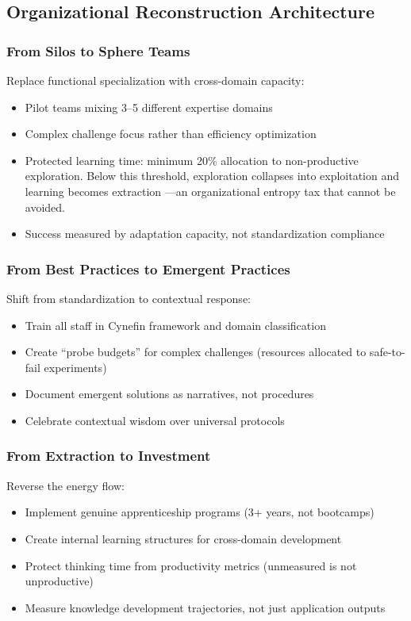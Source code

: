 \subsection{Organizational Reconstruction Architecture}
\label{sec:organizational-architecture}

\subsubsection{From Silos to Sphere Teams}

Replace functional specialization with cross-domain capacity:
\begin{itemize}
\item Pilot teams mixing 3--5 different expertise domains
\item Complex challenge focus rather than efficiency optimization
\item Protected learning time: minimum 20\% allocation to non-productive exploration. Below this threshold, exploration collapses into exploitation and learning becomes extraction \citep{march1991}---an organizational entropy tax that cannot be avoided.
\item Success measured by adaptation capacity, not standardization compliance
\end{itemize}

\subsubsection{From Best Practices to Emergent Practices}

Shift from standardization to contextual response:
\begin{itemize}
\item Train all staff in Cynefin framework and domain classification
\item Create ``probe budgets'' for complex challenges (resources allocated to safe-to-fail experiments)
\item Document emergent solutions as narratives, not procedures
\item Celebrate contextual wisdom over universal protocols
\end{itemize}

\subsubsection{From Extraction to Investment}

Reverse the energy flow:
\begin{itemize}
\item Implement genuine apprenticeship programs (3+ years, not bootcamps)
\item Create internal learning structures for cross-domain development
\item Protect thinking time from productivity metrics (unmeasured is not unproductive)
\item Measure knowledge development trajectories, not just application outputs
\end{itemize}

